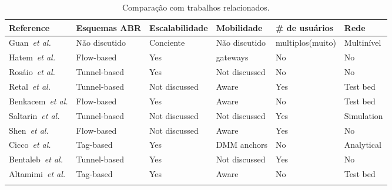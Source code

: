 \begin{table}[htb]
  \caption{Comparação com trabalhos relacionados.}
  \label{tab:comparison}
  \centering
  \scriptsize
  \begin{tabular}{p{2.8cm}p{2cm}p{2cm}p{2.2cm}p{2cm}p{2cm}}
    \toprule
    \textbf{Reference} &
    \textbf{Esquemas ABR} &
    \textbf{Escalabilidade} &
    \textbf{Mobilidade} &
    \textbf{\# de \newline usuários} &
    \textbf{Rede} \\
    \midrule

    Guan~\textit{et al.}~\cite{guan:2019:CLC} &
    Não discutido & Conciente & Não discutido & multiplos(muito) & Multinível \\
    \addlinespace
	\addlinespace

    Hatem~\textit{et al.}~\cite{khedherComNet2017,khedherLCN2017} &
    Flow-based & Yes & gateways & No & No \\
    \addlinespace
    \addlinespace

    Rosáio~\textit{et al.}~\cite{Basta2013a, Basta2014} &
    Tunnel-based & Yes & Not discussed & No & No \\
    \addlinespace
	\addlinespace
    Retal~\textit{et al.} \cite{Cho2014} &
    Tunnel-based & Not discussed & Aware & Yes & Test bed \\
    \addlinespace
	\addlinespace
    Benkacem~\textit{et al.} \cite{CostaRequena2014} &
    Flow-based & Yes & Aware & No & Test bed \\
    \addlinespace
	\addlinespace
    Saltarin~\textit{et al.} \cite{Ghazisaeedi2013} &
    Tunnel-based & Not discussed & Not discussed & Yes & Simulation \\
    \addlinespace
	\addlinespace
    Shen~\textit{et al.} \cite{Guerzoni2014} &
    Flow-based & Not discussed & Aware & Yes & No \\
    \addlinespace
	\addlinespace


    Cicco~\textit{et al.} \cite{Gurusanthosh2013} &
    Tag-based & Yes & \ac{DMM} anchors & No & Analytical \\
    \addlinespace
	\addlinespace
	
    Bentaleb~\textit{et al.} \cite{Hampel2013} &
    Tunnel-based & Yes & Not discussed & Yes & No \\
    \addlinespace
	\addlinespace
	
    Altamimi~\textit{et al.} \cite{Jin2013a} &
    Tag-based & Yes & Aware & No & Test bed \\
    \addlinespace
	\addlinespace
	

\end{tabular}
\end{table}
